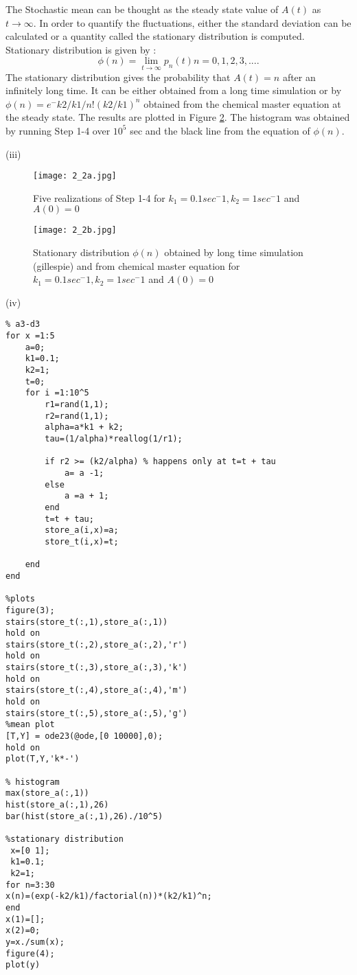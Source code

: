 \documentclass[10 pt]{article}
\begin{document}
\begin{multicols}{2}
\begin{flushleft}
The Stochastic mean can be thought as the steady state value of $A(t)$ as $t\rightarrow \infty$. In order to quantify the fluctuations, either the standard deviation can be calculated or a quantity called the stationary distribution is computed. Stationary distribution is given by : 
\begin{equation}\label{eq:7}
\phi(n) = \lim_{t\rightarrow\infty} p_n(t) 
n = 0,1,2,3,....
\end{equation}
The stationary distribution gives the probability that $A(t)=n$ after an infinitely long time. It can be either obtained from a long time simulation or by $\phi(n)=e^-k2/k1/n!(k2/k1)^n$ obtained from the chemical master equation at the steady state. The results are plotted in Figure \ref{4}. The histogram was obtained by running Step 1-4 over $10^5$ sec and the black line from the equation of $\phi(n)$.
\end{flushleft}
(iii)\begin{figure}[H]
\centerline{\texttt{[image: 2\_2a.jpg]}}
\caption{Five realizations of Step 1-4 for $k_1=0.1 sec^-1, k_2 = 1 sec^-1$ and $A(0)=0$}
\label{3}
\end{figure}
\begin{figure}[H]
\centerline{\texttt{[image: 2\_2b.jpg]}}
\caption{Stationary distribution $\phi(n)$ obtained by long time simulation (gillespie) and from chemical master equation for $k_1=0.1 sec^-1, k_2 = 1 sec^-1$ and $A(0)=0$}
\label{4}
\end{figure}
(iv)
\begin{lstlisting}
% a3-d3
for x =1:5
    a=0;
    k1=0.1;
    k2=1;
    t=0;
    for i =1:10^5
        r1=rand(1,1);
        r2=rand(1,1);
        alpha=a*k1 + k2;
        tau=(1/alpha)*reallog(1/r1);

        if r2 >= (k2/alpha) % happens only at t=t + tau
            a= a -1;
        else
            a =a + 1;        
        end
        t=t + tau;
        store_a(i,x)=a;
        store_t(i,x)=t;

    end
end

%plots
figure(3);
stairs(store_t(:,1),store_a(:,1))
hold on
stairs(store_t(:,2),store_a(:,2),'r')
hold on
stairs(store_t(:,3),store_a(:,3),'k')
hold on
stairs(store_t(:,4),store_a(:,4),'m')
hold on
stairs(store_t(:,5),store_a(:,5),'g')
%mean plot
[T,Y] = ode23(@ode,[0 10000],0);
hold on
plot(T,Y,'k*-')

% histogram
max(store_a(:,1))
hist(store_a(:,1),26)
bar(hist(store_a(:,1),26)./10^5)

%stationary distribution
 x=[0 1];
 k1=0.1;
 k2=1; 
for n=3:30
x(n)=(exp(-k2/k1)/factorial(n))*(k2/k1)^n;
end
x(1)=[];
x(2)=0;
y=x./sum(x);
figure(4);
plot(y)


\end{lstlisting}
\end{multicols}
\end{document}

